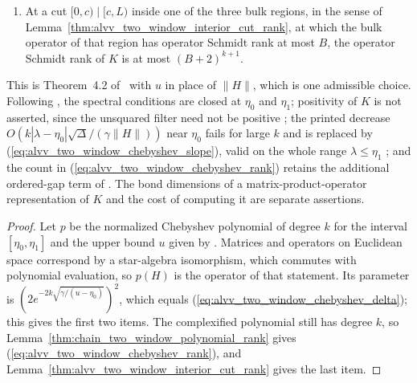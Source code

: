 \begin{lemma}
\begin{enumerate}
\begin{align}
                  \operatorname{OSR}_{J\mid J^c}(K)
                   & \le(qk)^{17(\ell+\lfloor k/(2\ell)\rfloor)}.
                  \label{eq:alvv_two_window_chebyshev_rank}
              \end{align}
        \item At a cut $[0,c)\mid[c,L)$ inside one of the three bulk regions,
              in the sense of
              Lemma~\ref{thm:alvv_two_window_interior_cut_rank}, at which
              the bulk operator of that region has operator Schmidt rank at
              most $B$, the operator Schmidt rank of $K$ is at most
              $(B+2)^{k+1}$.
    \end{enumerate}
    This is Theorem~4.2 of~\cite{Arad2016RigorousRG} with $u$ in place of
    $\|H\|$, which is one admissible choice. Following
    \cite{gap:alvv16_spectral_projector_boundary}, the spectral conditions
    are closed at $\eta_0$ and $\eta_1$; positivity of $K$ is not asserted,
    since the unsquared filter need not be positive
    \cite{gap:alvv16_chebyshev_filter_positivity}; the printed decrease
    $O(k|\lambda-\eta_0|\sqrt\Delta/(\gamma\|H\|))$ near $\eta_0$ fails for
    large $k$ and is replaced by (\ref{eq:alvv_two_window_chebyshev_slope}),
    valid on the whole range $\lambda\le\eta_1$
    \cite{gap:alvv16_chebyshev_near_ground_slope}; and the count in
    (\ref{eq:alvv_two_window_chebyshev_rank}) retains the additional ordered-gap
    term of \cite{gap:aklv13_interpolation_and_word_count}. The bond dimensions
    of a matrix-product-operator representation of $K$ and the cost of
    computing it are separate assertions.
\end{lemma}
\begin{proof}\leanok
    Let $p$ be the normalized Chebyshev polynomial of degree $k$ for the
    interval $[\eta_0,\eta_1]$ and the upper bound $u$ given by
    \cite[``The Chebyshev filter near the normalization point'']
    {QICLean2026Blueprint}. Matrices and operators on Euclidean space
    correspond by a star-algebra isomorphism, which commutes with polynomial
    evaluation, so $p(H)$ is the operator of that statement. Its parameter
    is $(2e^{-2k\sqrt{\gamma/(u-\eta_0)}})^2$, which equals
    (\ref{eq:alvv_two_window_chebyshev_delta}); this gives the first two
    items. The complexified polynomial still has degree $k$, so
    Lemma~\ref{thm:chain_two_window_polynomial_rank} gives
    (\ref{eq:alvv_two_window_chebyshev_rank}), and
    Lemma~\ref{thm:alvv_two_window_interior_cut_rank} gives the last item.
\end{proof}

